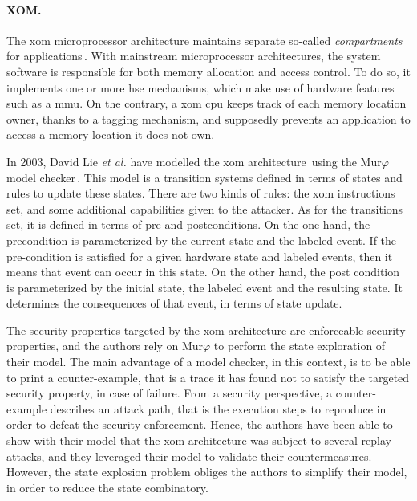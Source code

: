 \paragraph{XOM.}
%
The \ac{xom} microprocessor architecture maintains separate so-called
\emph{compartments} for applications\,\cite{lie2000architectural}.
%
With mainstream microprocessor architectures, the system software is responsible
for both memory allocation and access control.
%
To do so, it implements one or more \ac{hse} mechanisms, which make use of
hardware features such as a \ac{mmu}.
%
On the contrary, a \ac{xom} \ac{cpu} keeps track of each memory location owner,
thanks to a tagging mechanism, and supposedly prevents an application to access
a memory location it does not own.

In 2003, David Lie \emph{et al.} have modelled the \ac{xom}
architecture\,\cite{lie2003xom} using the Mur$\varphi$ model
checker\,\cite{murphi}.
%
This model is a transition systems defined in terms of states and rules to
update these states.
%
There are two kinds of rules: the \ac{xom} instructions set, and some additional
capabilities given to the attacker.
%
As for the transitions set, it is defined in terms of pre and postconditions.
%
On the one hand, the precondition is parameterized by the current state and the
labeled event.
%
If the pre-condition is satisfied for a given hardware state and labeled events,
then it means that event can occur in this state.
%
On the other hand, the post condition is parameterized by the initial state, the
labeled event and the resulting state.
%
It determines the consequences of that event, in terms of state update.

The security properties targeted by the \ac{xom} architecture are enforceable
security properties, and the authors rely on Mur$\varphi$ to perform the state
exploration of their model.
%
The main advantage of a model checker, in this context, is to be able to print a
counter-example, that is a trace it has found not to satisfy the targeted
security property, in case of failure.
%
From a security perspective, a counter-example describes an attack path, that is
the execution steps to reproduce in order to defeat the security enforcement.
%
Hence, the authors have been able to show with their model that the \ac{xom}
architecture was subject to several replay attacks, and they leveraged their
model to validate their countermeasures.
%
However, the state explosion problem obliges the authors to simplify their
model, in order to reduce the state combinatory.

